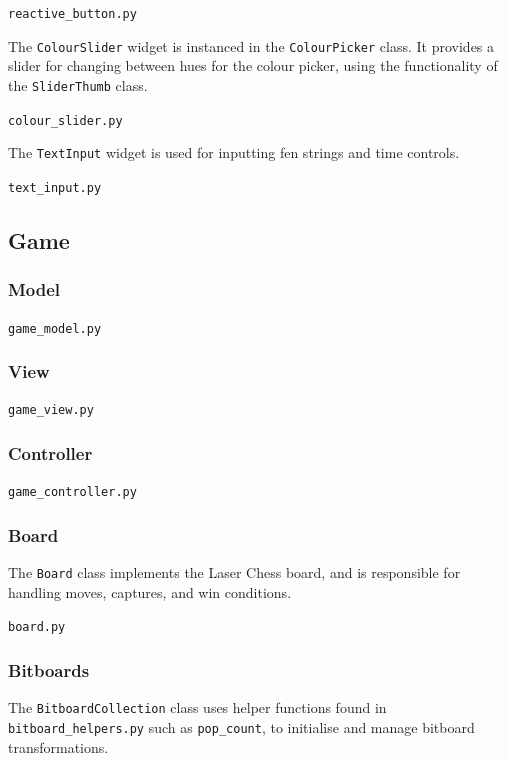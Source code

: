 \documentclass[../main/main.tex]{subfiles}
\begin{document}
\noindent\verb|reactive_button.py|


\bigskip
\noindent The \lstinline{ColourSlider} widget is instanced in the \lstinline{ColourPicker} class. It provides a slider for changing between hues for the colour picker, using the functionality of the \lstinline{SliderThumb} class.

\noindent\verb|colour_slider.py|


\bigskip
\noindent The \lstinline{TextInput} widget is used for inputting fen strings and time controls.

\noindent\verb|text_input.py|


\subsection{Game}
\subsubsection{Model}
\noindent\verb|game_model.py|


\subsubsection{View}
\noindent\verb|game_view.py|


\subsubsection{Controller}
\noindent\verb|game_controller.py|


\subsubsection{Board}
The \lstinline{Board} class implements the Laser Chess board, and is responsible for handling moves, captures, and win conditions.

\noindent\verb|board.py|


\subsubsection{Bitboards}
The \lstinline{BitboardCollection} class uses helper functions found in \lstinline{bitboard_helpers.py} such as \lstinline{pop_count}, to initialise and manage bitboard transformations.
\end{document}
